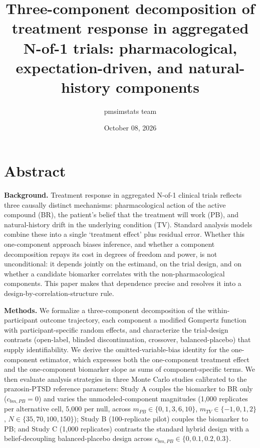 \documentclass[
  11pt,
]{article}
\title{Three-component decomposition of treatment response in aggregated N-of-1 trials: pharmacological, expectation-driven, and natural-history components}
\author{pmsimstats team}
\date{October 08, 2026}
\begin{document}
\maketitle

{
\setcounter{tocdepth}{2}
\tableofcontents
}
\section*{Abstract}\label{abstract}

\textbf{Background.} Treatment response in aggregated N-of-1 clinical
trials reflects three causally distinct mechanisms: pharmacological
action of the active compound (BR), the patient's belief that the
treatment will work (PB), and natural-history drift in the
underlying condition (TV). Standard analysis models combine these into
a single `treatment effect' plus residual error. Whether this
one-component approach biases inference, and whether a component decomposition
repays its cost in degrees of freedom and power, is not
unconditional: it depends jointly on the estimand, on the trial
design, and on whether a candidate biomarker correlates with the
non-pharmacological components. This paper makes that dependence
precise and resolves it into a design-by-correlation-structure rule.

\textbf{Methods.} We formalize a three-component decomposition of the
within-participant outcome trajectory, each component a modified
Gompertz function with participant-specific random effects, and
characterize the trial-design contrasts (open-label, blinded
discontinuation, crossover, balanced-placebo) that supply
identifiability. We derive the omitted-variable-bias identity for
the one-component estimator, which expresses both the one-component
treatment effect and the one-component biomarker slope as sums of
component-specific terms. We then evaluate analysis strategies in
three Monte Carlo studies calibrated to the prazosin-PTSD reference
parameters: Study A couples the biomarker to BR only (\(c_{bm,PB}=0\))
and varies the unmodeled-component magnitudes (1,000 replicates per
alternative cell, 5,000 per null, across \(m_{PB} \in \{0,1,3,6,10\}\),
\(m_{TV} \in \{-1,0,1,2\}\), \(N \in \{35,70,100,150\}\)); Study B
(100-replicate pilot) couples the biomarker to PB; and Study C
(1,000 replicates) contrasts the standard hybrid design with a
belief-decoupling balanced-placebo design across
\(c_{bm,PB} \in \{0,0.1,0.2,0.3\}\).
\end{document}

